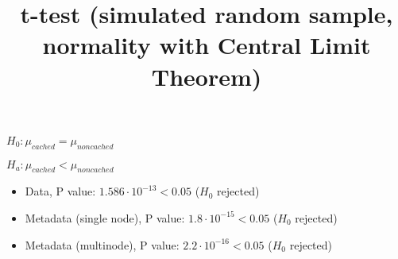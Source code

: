 \documentclass[12pt]{article}
\begin{document}
	\title{t-test (simulated random sample, normality with Central Limit Theorem)}
	\date{}
	\maketitle
	
	$H_0: \mu_{cached} = \mu_{noncached}$
	
	$H_a: \mu_{cached} < \mu_{noncached}$
	
	\begin{itemize}
		\item Data, P value: $1.586\cdot10^{-13} < 0.05$ ($H_0$ rejected)
		\item Metadata (single node), P value: $1.8\cdot10^{-15} < 0.05$ ($H_0$ rejected)
		\item Metadata (multinode), P value: $2.2\cdot10^{-16} < 0.05$ ($H_0$ rejected)
	\end{itemize}
\end{document}
